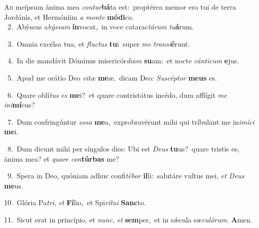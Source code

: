 \lettrine{\initial\textcolor{\initialcolor}{A}}{d} meípsum ánima mea \textit{con}\-\textit{tur}\textbf{bá}ta est:~\star proptérea memor ero tui de terra Jordánis, et Hermóniim \textit{a} \textit{mon}\-\textit{te} \textbf{mó}\-\textbf{di}co.\\
{\numbfont\textcolor{\numbcolor}{~2.}}~Abýssus a\-\textit{býs}\-\textit{sum} \textbf{ín}\-vocat,~\star in voce catarac\-\textit{tá}\-\textit{rum} \textit{tu}\-\textbf{á}rum.\par
{\numbfont\textcolor{\numbcolor}{~3.}}~Omnia excélsa tua, et \textit{fluc}\-\textit{tus} \textbf{tu}\-i~\star super \textit{me} \textit{trans}\-\textit{i}\textbf{é}runt.\par
{\numbfont\textcolor{\numbcolor}{~4.}}~In die mandávit Dóminus misericór\-\textit{di}\-\textit{am} \textbf{su}\-am:~\star et nocte \textit{cán}\-\textit{ti}\textit{cum} \textbf{e}\-jus.\par
{\numbfont\textcolor{\numbcolor}{~5.}}~Apud me orátio Deo \textit{vi}\-\textit{tæ} \textbf{me}\-æ,~\star dicam Deo: \textit{Su}\-\textit{scép}\textit{tor} \textbf{me}\-\textbf{us} es.\par
{\numbfont\textcolor{\numbcolor}{~6.}}~Quare oblí\textit{tus} \textit{es} \textbf{me}\-i?~\star et quare contristátus incédo, dum afflígit \textit{me} \textit{in}\-\textit{i}\textbf{mí}cus?\par
{\numbfont\textcolor{\numbcolor}{~7.}}~Dum confringúntur \textit{os}\-\textit{sa} \textbf{me}\-a,~\star exprobravérunt mihi qui tríbulant me in\-\textit{i}\-\textit{mí}\textit{ci} \textbf{me}\-i.\par
{\numbfont\textcolor{\numbcolor}{~8.}}~Dum dicunt mihi per síngulos dies: Ubi est \textit{De}\-\textit{us} \textbf{tu}\-us?~\star quare tristis es, ánima mea? et \textit{qua}\-\textit{re} \textit{con}\-\textbf{túr}\textbf{bas} me?\par
{\numbfont\textcolor{\numbcolor}{~9.}}~Spera in Deo, quóniam adhuc confi\-\textit{té}\-\textit{bor} \textbf{il}\-li:~\star salutáre vultus mei, \textit{et} \textit{De}\-\textit{us} \textbf{me}\-us.\par
{\numbfont\textcolor{\numbcolor}{10.}}~Glória Pa\-\textit{tri}\-, \textit{et} \textbf{Fí}\-lio,~\star et Spi\-\textit{rí}\-\textit{tu}\textit{i} \textbf{Sanc}\-to.\par
{\numbfont\textcolor{\numbcolor}{11.}}~Sicut erat in princípio, et \textit{nunc}\-, \textit{et} \textbf{sem}\-per,~\star et in sǽcula sæ\-\textit{cu}\-\textit{ló}\textit{rum}. \textbf{A}\-men.\par
